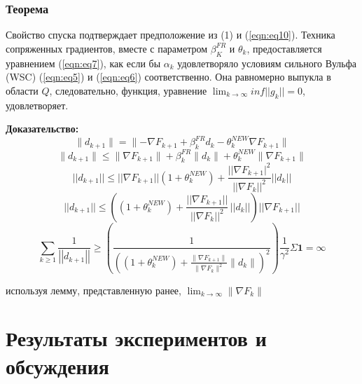 \subsubsection{Теорема}

Свойство спуска подтверждает предположение из (1) и (\ref{eqn:eq10}). Техника сопряженных
градиентов, вместе с параметром $\beta_{K}^{FR}$ и $\theta_{k}$, предоставляется
уравнением (\ref{eqn:eq7}), как если бы $\alpha_{k}$ удовлетворяло условиям сильного Вульфа
(WSC) (\ref{eqn:eq5}) и (\ref{eqn:eq6}) соответственно. Она равномерно выпукла в области $Q$,
следовательно, функция, уравнение 
$\lim_{k \rightarrow \infty} inf||g_{k}|| = 0$, удовлетворяет.

\noindent \textbf{Доказательство:}
\begin{equation*}
    \lVert d_{k+1} \rVert = \lVert -\nabla F_{k+1}+\beta_{k}^{F R}d_{k}-\theta_{k}^{N E W} \nabla F_{k+1} \rVert
\end{equation*}
\begin{equation*}
    \|d_{k+1}\|\leq\|\nabla F_{k+1}\|+\beta_{k}^{F R}\|d_{k}\|+\theta_{k}^{N E W}\|\nabla F_{k+1}\|
\end{equation*}
\begin{equation*}
    ||d_{k+1}||\leq||\nabla F_{k+1}||(1+\theta_{k}^{N E W})+\frac{||\nabla F_{k+1}|^{2}}{||\nabla F_{k}||^{2}}||d_{k}||
\end{equation*}
\begin{equation*}
    ||d_{k+1}||\leq\left(\left(1+\theta_{k}^{N E W}\right)+\frac{||\nabla F_{k+1}||}{||\nabla F_{k}||^{2}}\,||d_{k}||\right)||\nabla F_{k+1}||
\end{equation*}
\begin{equation*}
    \sum_{k \geq 1}{\frac{1}{\left|\left|d_{k+1}\right|\right|}} \geq \left( 
        \frac{1}{
            \left(
                \left(1 + \theta_{k}^{N E W}\right) + 
                \frac{\lVert \nabla F_{k+1} \rVert}{\lVert \nabla F_{k} \rVert^{2}}\lVert d_{k} \rVert
            \right)^{2}
        }
    \right) \frac{1}{\gamma^{2}}\Sigma\mathbf{1} = \infty
\end{equation*}

\noindent используя лемму, представленную ранее, 
$\lim_{k \rightarrow \infty} \lVert \nabla F_{k} \rVert$

\section{Результаты экспериментов и обсуждения}

